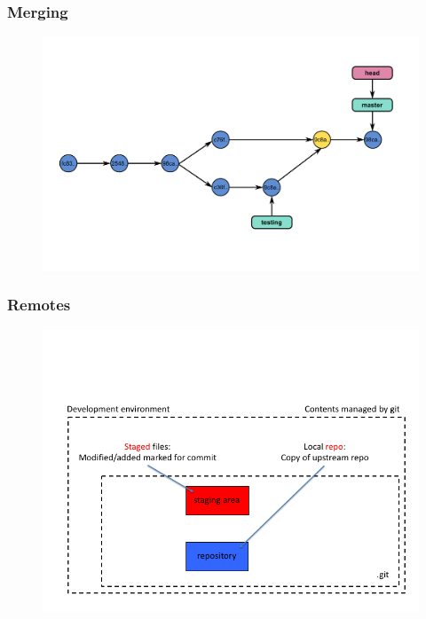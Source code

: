 \documentclass[11pt]{beamer}
\begin{document}
\begin{frame}[fragile]
\frametitle{Merging}
\begin{figure}[htp]
 \centering
 \includegraphics[scale=0.35]{branch6.png}
\end{figure}


\end{frame}




\begin{frame}[fragile]
\frametitle{Remotes}

\begin{figure}[htp]
 \centering
 \includegraphics[scale=0.35]{gitC.png}
\end{figure}

\end{frame}
\end{document}
